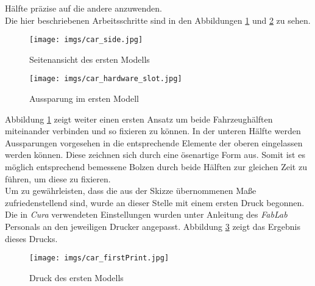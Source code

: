 \documentclass[.../Dokumentation.tex]{subfiles}
\begin{document}
Hälfte präzise auf die andere anzuwenden.\\
Die hier beschriebenen Arbeitsschritte sind in den Abbildungen 
\ref{fig-car-side} und \ref{fig-car-slot} zu sehen.
\begin{figure}[H]
\begin{center}
    \texttt{[image: imgs/car\_side.jpg]}
    \caption{Seitenansicht des ersten Modells}
    \label{fig-car-side}
\end{center}
\end{figure}
\begin{figure}[H]
\begin{center}
    \texttt{[image: imgs/car\_hardware\_slot.jpg]}
    \caption{Aussparung im ersten Modell}
    \label{fig-car-slot}
\end{center}
\end{figure}
\noindent
Abbildung \ref{fig-car-side} zeigt weiter einen ersten Ansatz um beide 
Fahrzeughälften miteinander verbinden und so fixieren zu können. 
In der unteren Hälfte werden Aussparungen vorgesehen in die entsprechende 
Elemente der oberen eingelassen werden können. Diese zeichnen sich durch eine 
ösenartige Form aus. Somit ist es möglich entsprechend bemessene Bolzen durch 
beide Hälften zur gleichen Zeit zu führen, um diese zu fixieren.\\
Um zu gewährleisten, dass die aus der Skizze übernommenen Maße 
zufriedenstellend sind, wurde an dieser Stelle mit einem ersten Druck begonnen.
Die in \textit{Cura} verwendeten Einstellungen wurden unter Anleitung 
des \textit{FabLab} Personals an den jeweiligen Drucker angepasst. 
Abbildung \ref{fig-car-firstPrint} zeigt das Ergebnis dieses Drucks.
\begin{figure}[H]
    \begin{center}
        \texttt{[image: imgs/car\_firstPrint.jpg]}
        \caption{Druck des ersten Modells}
        \label{fig-car-firstPrint}
    \end{center}
    \end{figure}
\end{document}

